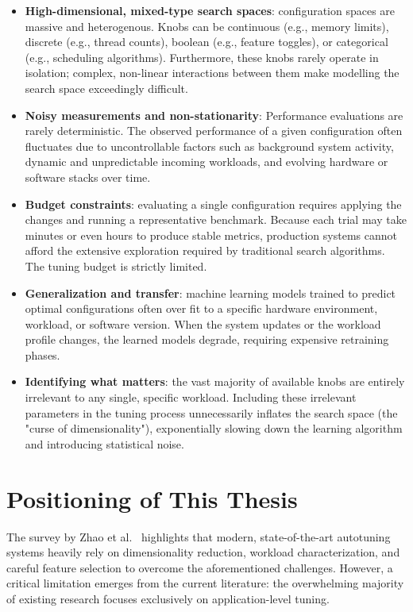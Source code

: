 \begin{itemize}
    \item \textbf{High-dimensional, mixed-type search spaces}: configuration spaces are massive and heterogenous. Knobs can be continuous (e.g., memory limits), discrete (e.g., thread counts), boolean (e.g., feature toggles), or categorical (e.g., scheduling algorithms). Furthermore, these knobs rarely operate in isolation; complex, non-linear interactions between them make modelling the search space exceedingly difficult.
    \item \textbf{Noisy measurements and non-stationarity}: Performance evaluations are rarely deterministic. The observed performance of a given configuration often fluctuates due to uncontrollable factors such as background system activity, dynamic and unpredictable incoming workloads, and evolving hardware or software stacks over time.
    \item \textbf{Budget constraints}: evaluating a single configuration requires applying the changes and running a representative benchmark. Because each trial may take minutes or even hours to produce stable metrics, production systems cannot afford the extensive exploration required by traditional search algorithms. The tuning budget is strictly limited.
    \item \textbf{Generalization and transfer}: machine learning models trained to predict optimal configurations often over fit to a specific hardware environment, workload, or software version. When the system updates or the workload profile changes, the learned models degrade, requiring expensive retraining phases.
    \item \textbf{Identifying what matters}: the vast majority of available knobs are entirely irrelevant to any single, specific workload. Including these irrelevant parameters in the tuning process unnecessarily inflates the search space (the "curse of dimensionality"), exponentially slowing down the learning algorithm and introducing statistical noise.
\end{itemize}

\section{Positioning of This Thesis}\label{sec:bg-positioning}

The survey by Zhao et al.~\cite{autotune_survey} highlights that modern, state-of-the-art autotuning systems heavily rely on dimensionality reduction, workload characterization, and careful feature selection to overcome the aforementioned challenges.
However, a critical limitation emerges from the current literature: the overwhelming majority of existing research focuses exclusively on application-level tuning.

